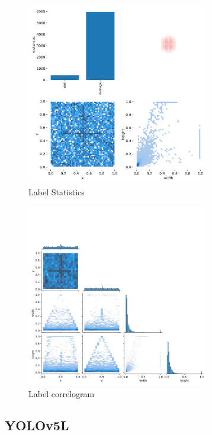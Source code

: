 \documentclass[conference]{IEEEtran}
\begin{document}
\begin{figure}[H]
    \centering
    \includegraphics[width=8cm]{Images/YOLOv5L/labels.jpg}
    \caption{Label Statistics}
\end{figure}

\begin{figure}[H]
    \centering
    \includegraphics[width=8cm]{Images/YOLOv5L/labels_correlogram.jpg}
    \caption{Label correlogram}
\end{figure}

\cleardoublepage
\subsection{YOLOv5L}
\end{document}

